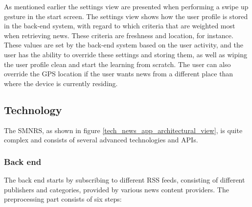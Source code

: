 As mentioned earlier the settings view are presented when performing a swipe up gesture in the start screen. The settings view shows how the user profile is stored in the back-end system, with regard to which criteria that are weighted most when retrieving news. These criteria are freshness and location, for instance. These values are set by the back-end system based on the user activity, and the user has the ability to override these settings and storing them, as well as wiping the user profile clean and start the learning from scratch. The user can also override the GPS location if the user wants news from a different place than where the device is currently residing.


\subsection{Technology}
The SMNRS, as shown in figure \ref{tech_news_app_architectural_view}, is quite complex and consists of several advanced technologies and APIs.

\subsubsection{Back end}
The back end starts by subscribing to different RSS feeds, consisting of different publishers and categories, provided by various news content providers. The preprocessing part consists of six steps:

